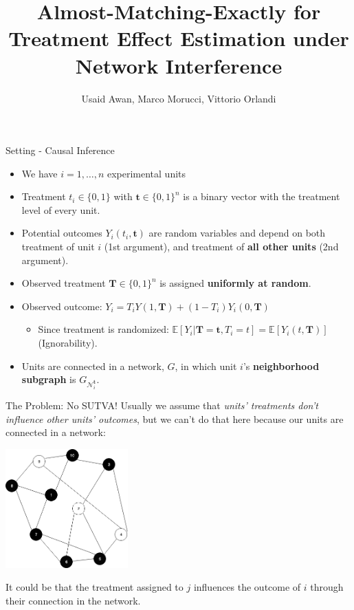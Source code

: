 \documentclass[newPxFont,numfooter,sectionpages]{beamer}
\title{Almost-Matching-Exactly for Treatment Effect Estimation under Network Interference}
\subtitle{}
\author{Usaid Awan, Marco Morucci, Vittorio Orlandi}
\date{}
\newcommand{\E}{\mathbb{E}}
\newcommand{\bt}{\mathbf{t}}
\newcommand{\bT}{\mathbf{T}}
\newcommand{\Gni}{G_{\mathcal{N}_i^\bt}}
\begin{document}
 
\maketitle


\begin{frame}{Setting - Causal Inference}
\begin{itemize}
  \item We have $i=1, \dots, n$ experimental units
  \item Treatment $t_i \in \{0, 1\}$ with $\bt \in \{0, 1\}^n$ is a binary vector with the treatment level of every unit.
  \item Potential outcomes $Y_i(t_i, \bt)$ are random variables and depend on both treatment of unit $i$ (1st argument), and treatment of \textbf{all other units} (2nd argument).
  \item Observed treatment $\bT \in \{0, 1\}^n$ is assigned \textbf{uniformly at random}.
  \item Observed outcome: $Y_i = T_iY(1, \bT) + (1-T_i)Y_i(0, \bT)$
  \begin{itemize}
    \item Since treatment is randomized: $\E[Y_i|\bT = \bt, T_i = t] = \E[Y_i(t, \bT)]$ (Ignorability).
  \end{itemize}
  \item Units are connected in a network, $G$, in which unit $i$'s \textbf{neighborhood subgraph} is $\Gni$.
\end{itemize}
\end{frame}

\begin{frame}{The Problem: No SUTVA!}
Usually we assume that \textit{units' treatments don't influence other units' outcomes}, but we can't do that here because our units are connected in a network:
\begin{center}
\includegraphics[height=1.8in]{graph1.png}
\end{center}
It could be that the treatment assigned to $j$ influences the outcome of $i$ through their connection in the network.
\end{frame}
\end{document}
